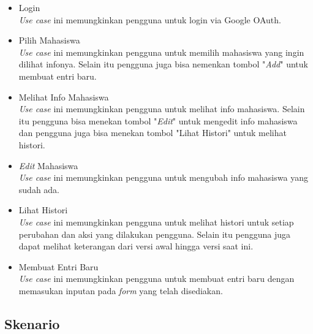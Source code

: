 \begin{itemize}
\item Login\\
{\it Use case} ini memungkinkan pengguna untuk login via Google OAuth.
\item Pilih Mahasiswa\\
{\it Use case} ini memungkinkan pengguna untuk memilih mahasiswa yang ingin dilihat
infonya. Selain itu pengguna juga bisa nemenkan tombol "{\it Add}" untuk
membuat entri baru.
\item Melihat Info Mahasiswa\\
{\it Use case} ini memungkinkan pengguna untuk melihat info mahasiswa. Selain itu
pengguna bisa menekan tombol "{\it Edit}" untuk mengedit info mahasiswa dan
pengguna juga bisa menekan tombol "Lihat Histori" untuk melihat histori.
\item {\it Edit} Mahasiswa\\
{\it Use case} ini memungkinkan pengguna untuk mengubah info mahasiswa yang
sudah ada.
\item Lihat Histori\\
{\it Use case} ini memungkinkan pengguna untuk melihat histori untuk setiap perubahan
dan aksi yang dilakukan pengguna. Selain itu pengguna juga dapat melihat keterangan dari versi awal hingga versi saat ini.
\item Membuat Entri Baru\\
{\it Use case} ini memungkinkan pengguna untuk membuat entri baru dengan memasukan
inputan pada {\it form} yang telah disediakan.
\end{itemize}

\subsection{Skenario}

